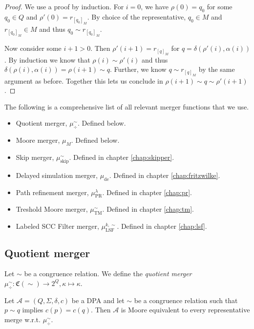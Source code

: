 \begin{proof}
	We use a proof by induction. For $i = 0$, we have $\rho(0) = q_0$ for some $q_0 \in Q$ and $\rho'(0) = r_{[q_0]_M}$. By choice of the representative, $q_0 \in M$ and $r_{[q_0]_M} \in M$ and thus $q_0 \sim r_{[q_0]_M}$.
	
	Now consider some $i+1 > 0$. Then $\rho'(i+1) = r_{[q]_M}$ for $q = \delta(\rho'(i), \alpha(i))$. By induction we know that $\rho(i) \sim \rho'(i)$ and thus $\delta(\rho(i), \alpha(i)) = \rho(i+1) \sim q$. Further, we know $q \sim r_{[q]_M}$ by the same argument as before. Together this lets us conclude in $\rho(i+1) \sim q \sim \rho'(i+1)$.
\end{proof}

\vspace{10pt}

The following is a comprehensive list of all relevant merger functions that we use.

\begin{itemize}
	\item Quotient merger, $\mu_\div^\sim$. Defined below.
	\item Moore merger, $\mu_M$. Defined below.
	\item Skip merger, $\mu_\text{skip}^\sim$. Defined in chapter \ref{chap:skipper}.
	\item Delayed simulation merger, $\mu_\text{de}$. Defined in chapter \ref{chap:fritzwilke}.
	\item Path refinement merger, $\mu_\text{PR}^\lambda$. Defined in chapter \ref{chap:pr}.
	\item Treshold Moore merger, $\mu_\text{TM}^\sim$. Defined in chapter \ref{chap:tm}.
	\item Labeled SCC Filter merger, $\mu_\text{LSF}^{k,\sim}$. Defined in chapter \ref{chap:lsf}.
\end{itemize}

\vspace{5pt}

\subsection{Quotient merger}
\begin{defn}
	Let $\sim$ be a congruence relation. We define the \emph{quotient merger} $\mu^\sim_\div : \mathfrak{C}(\sim) \rightarrow 2^Q, \kappa \mapsto \kappa$. 
\end{defn}


\begin{lem}
\label{lem:general:congrel_prio_implies_moore}
	Let $\mathcal{A} = (Q, \Sigma, \delta, c)$ be a DPA and let $\sim$ be a congruence relation such that $p \sim q$ implies $c(p) = c(q)$. Then $\mathcal{A}$ is Moore equivalent to every representative merge w.r.t. $\mu_\div^\sim$.
\end{lem} 

